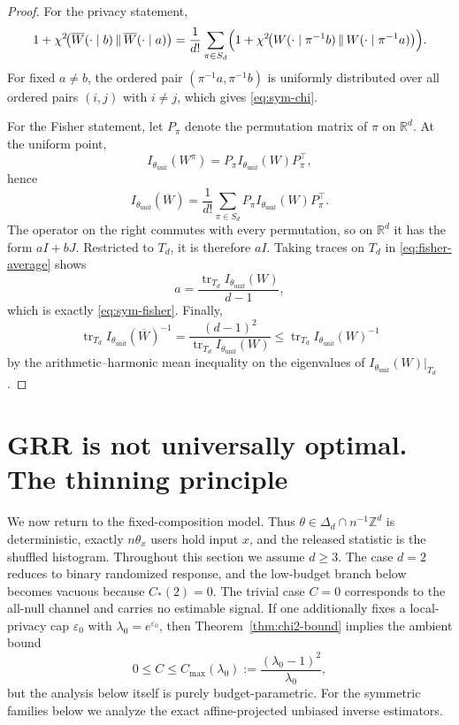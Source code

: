 \documentclass[11pt]{amsart}
\numberwithin{equation}{section}
\theoremstyle{definition}
\newcommand{\R}{\mathbb R}
\begin{document}
\begin{proof}
For the privacy statement,
\[
1+\chi^2\!\bigl(\overline W(\cdot\mid b)\,\|\,\overline W(\cdot\mid a)\bigr)
=
\frac{1}{d!}\sum_{\pi\in S_d}
\Bigl(1+\chi^2\!\bigl(W(\cdot\mid \pi^{-1}b)\,\|\,W(\cdot\mid \pi^{-1}a)\bigr)\Bigr).
\]
For fixed \(a\neq b\), the ordered pair \((\pi^{-1}a,\pi^{-1}b)\) is uniformly distributed over all
ordered pairs \((i,j)\) with \(i\neq j\), which gives \eqref{eq:sym-chi}.

For the Fisher statement, let \(P_\pi\) denote the permutation matrix of \(\pi\) on \(\R^d\).
At the uniform point,
\[
I_{\theta_{\mathrm{unif}}}(W^\pi)=P_\pi I_{\theta_{\mathrm{unif}}}(W)P_\pi^\top,
\]
hence
\[
I_{\theta_{\mathrm{unif}}}(\overline W)
=
\frac{1}{d!}\sum_{\pi\in S_d} P_\pi I_{\theta_{\mathrm{unif}}}(W)P_\pi^\top. \tag{9.4}\label{eq:fisher-average}
\]
The operator on the right commutes with every permutation, so on \(\R^d\) it has the form \(aI+bJ\).
Restricted to \(T_d\), it is therefore \(aI\).  Taking traces on \(T_d\) in \eqref{eq:fisher-average}
shows
\[
a=\frac{\operatorname{tr}_{T_d} I_{\theta_{\mathrm{unif}}}(W)}{d-1},
\]
which is exactly \eqref{eq:sym-fisher}.  Finally,
\[
\operatorname{tr}_{T_d} I_{\theta_{\mathrm{unif}}}(\overline W)^{-1}
=
\frac{(d-1)^2}{\operatorname{tr}_{T_d} I_{\theta_{\mathrm{unif}}}(W)}
\le
\operatorname{tr}_{T_d} I_{\theta_{\mathrm{unif}}}(W)^{-1}
\]
by the arithmetic--harmonic mean inequality on the eigenvalues of
\(I_{\theta_{\mathrm{unif}}}(W)\big|_{T_d}\).
\end{proof}

\section{GRR is not universally optimal. The thinning principle}\label{sec:thinning}

We now return to the fixed-composition model.
Thus \(\theta\in\Delta_d\cap n^{-1}\mathbb Z^d\) is deterministic, exactly \(n\theta_x\) users hold input \(x\),
and the released statistic is the shuffled histogram.
Throughout this section we assume \(d\ge 3\).
The case \(d=2\) reduces to binary randomized response, and the low-budget branch below becomes vacuous because
\(C_\ast(2)=0\).
The trivial case \(C=0\) corresponds to the all-null channel and carries no estimable signal.
If one additionally fixes a local-privacy cap \(\varepsilon_0\) with \(\lambda_0=e^{\varepsilon_0}\), then
Theorem~\ref{thm:chi2-bound} implies the ambient bound
\[
0\le C\le C_{\max}(\lambda_0):=\frac{(\lambda_0-1)^2}{\lambda_0},
\]
but the analysis below itself is purely budget-parametric.
For the symmetric families below we analyze the exact affine-projected unbiased inverse estimators.
\end{document}
